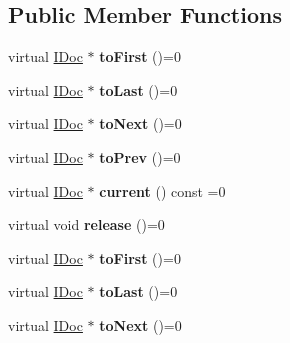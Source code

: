 \subsection*{Public Member Functions}
\begin{DoxyCompactItemize}
\item 
\mbox{\label{class_i_doc_iterator_aadc1f61e6894944f5487ac6e0d186a90}} 
virtual \mbox{\hyperlink{class_i_doc}{I\+Doc}} $\ast$ {\bfseries to\+First} ()=0
\item 
\mbox{\label{class_i_doc_iterator_a8356a7431b9470d74a2e935fa6d1956e}} 
virtual \mbox{\hyperlink{class_i_doc}{I\+Doc}} $\ast$ {\bfseries to\+Last} ()=0
\item 
\mbox{\label{class_i_doc_iterator_a6f1bc9563d9008d3f661b98c5c87066c}} 
virtual \mbox{\hyperlink{class_i_doc}{I\+Doc}} $\ast$ {\bfseries to\+Next} ()=0
\item 
\mbox{\label{class_i_doc_iterator_a4132ed88a702854345611b79b9a23eee}} 
virtual \mbox{\hyperlink{class_i_doc}{I\+Doc}} $\ast$ {\bfseries to\+Prev} ()=0
\item 
\mbox{\label{class_i_doc_iterator_ace3bcef00bcf5d5d641b69018ddb9a18}} 
virtual \mbox{\hyperlink{class_i_doc}{I\+Doc}} $\ast$ {\bfseries current} () const =0
\item 
\mbox{\label{class_i_doc_iterator_a0876d4fe51d8dc795764951ff6eee220}} 
virtual void {\bfseries release} ()=0
\item 
\mbox{\label{class_i_doc_iterator_aadc1f61e6894944f5487ac6e0d186a90}} 
virtual \mbox{\hyperlink{class_i_doc}{I\+Doc}} $\ast$ {\bfseries to\+First} ()=0
\item 
\mbox{\label{class_i_doc_iterator_a8356a7431b9470d74a2e935fa6d1956e}} 
virtual \mbox{\hyperlink{class_i_doc}{I\+Doc}} $\ast$ {\bfseries to\+Last} ()=0
\item 
\mbox{\label{class_i_doc_iterator_a6f1bc9563d9008d3f661b98c5c87066c}} 
virtual \mbox{\hyperlink{class_i_doc}{I\+Doc}} $\ast$ {\bfseries to\+Next} ()=0

\end{DoxyCompactItemize}
